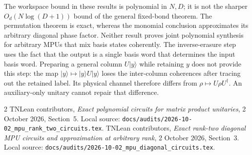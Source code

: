 \documentclass[11pt]{article}
\begin{document}
The workspace bound in these results is polynomial in $N,D$;
it is not the sharper $O_d(N\log(D+1))$ bound of the general
fixed-bond theorem. The permutation theorem is exact, whereas
the monomial conclusion approximates its arbitrary diagonal
phase factor. Neither result proves joint polynomial synthesis
for arbitrary MPUs that mix basis states coherently.
The inverse-erasure step uses the fact that the output is a
single basis word that determines the input basis word.
Preparing a general column $U|y\rangle$ while retaining $y$
does not provide this step: the map
$|y\rangle\mapsto|y\rangle U|y\rangle$ loses the inter-column
coherences after tracing out the retained label. Its physical
channel therefore differs from $\rho\mapsto U\rho U^\dagger$.
An auxiliary-only unitary cannot repair that difference.

\begin{thebibliography}{2}
TNLean contributors,
\emph{Exact polynomial circuits for matrix product unitaries},
2 October 2026, Section~5.
Local source:
\nolinkurl{docs/audits/2026-10-02_mpu_rank_two_circuits.tex}.
TNLean contributors,
\emph{Exact rank-two diagonal MPU circuits and approximation at arbitrary rank},
2 October 2026, Section~3.
Local source:
\nolinkurl{docs/audits/2026-10-02_mpu_diagonal_circuits.tex}.
\end{thebibliography}
\end{document}

